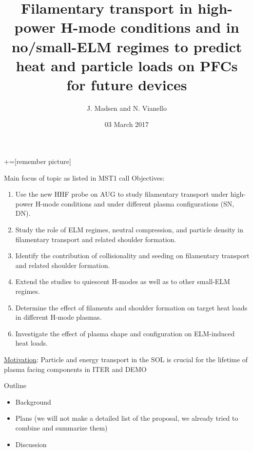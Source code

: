 \documentclass[10pt, compress]{beamer}
\title{Filamentary transport in high-power H-mode conditions and in
  no/small-ELM regimes to predict heat and particle loads on PFCs for
  future devices}
\date{03 March 2017}
\author[Topic 21. J. Madsen and N.Vianello]{J. Madsen and N. Vianello}
\begin{document}
+=[remember picture]
\maketitle

\begin{frame}{Main focus of topic as listed in MST1 call}
\vspace{-1cm}
Objectives:
\begin{enumerate}
\item Use the new HHF probe on AUG to study filamentary transport under
high-power H-mode conditions and under different plasma configurations (SN,
DN).
\item Study the role of ELM regimes, neutral compression, and particle density in
filamentary transport and related shoulder formation.
\item Identify the contribution of collisionality and seeding on filamentary transport
and related shoulder formation.
\item Extend the studies to quiescent H-modes as well as to other small-ELM regimes.
\item Determine the effect of filaments and shoulder formation on target heat loads
in different H-mode plasmas.
\item Investigate the effect of plasma shape and configuration on ELM-induced heat
loads.
\end{enumerate}
\underline{Motivation}: Particle and energy transport in the SOL is crucial for the lifetime of plasma facing components in ITER and DEMO
\end{frame}

\begin{frame}{Outline}
	\begin{itemize}
		\item Background 
		\item Plans (we will not make a detailed list of the
                  proposal, we already tried to combine and summarize them)
		\item Discussion
	\end{itemize}	
\end{frame}
\end{document}
